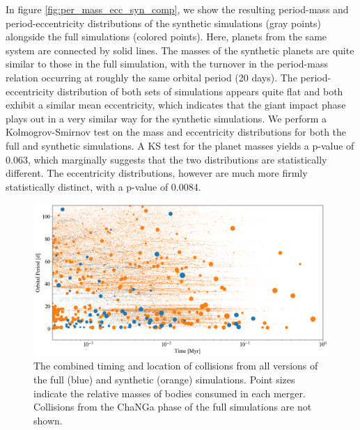In figure \ref{fig:per_mass_ecc_syn_comp}, we show the resulting period-mass and period-eccentricity distributions of the synthetic simulations (gray points) alongside the full simulations (colored points). Here, planets from the same system are connected by solid lines. The masses of the synthetic planets are quite similar to those in the full simulation, with the turnover in the period-mass relation occurring at roughly the same orbital period (20 days). The period-eccentricity distribution of both sets of simulations appears quite flat and both exhibit a similar mean eccentricity, which indicates that the giant impact phase plays out in a very similar way for the synthetic simulations. We perform a Kolmogrov-Smirnov test on the mass and eccentricity distributions for both the full and synthetic simulations. A KS test for the planet masses yields a p-value of 0.063, which marginally suggests that the two distributions are statistically different. The eccentricity distributions, however are much more firmly statistically distinct, with a p-value of 0.0084.

\begin{figure}
\begin{center}
    \includegraphics[width=\textwidth]{figures/stip/full_coll_syn_comp.png}
    \caption{The combined timing and location of collisions from all versions of the full (blue) and synthetic (orange) simulations. Point sizes indicate the relative masses of bodies consumed in each merger. Collisions from the {\sc ChaNGa} phase of the full simulations are not shown.\label{fig:full_coll_syn_comp}}
\end{center}
\end{figure}

